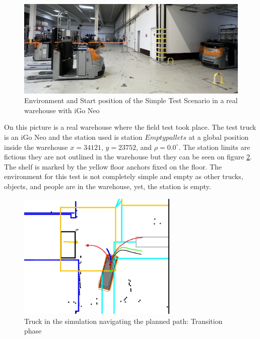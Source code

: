 \begin{figure}[H]
    \begin{center}
        \includegraphics[width=5in]{images/Chap3/Start_Sc1.jpg} %
        \caption{Environment and Start position of the Simple Test Scenario in a real warehouse
        with iGo Neo}
        \label{OptResult11}
        \end{center}    
\end{figure}

On this picture is a real warehouse where the field test took place.
The test truck is an iGo Neo and the station used is station \(Empty pallets\) at a 
global position inside the warehouse \(x = 34121\), \(y = 23752\), and \(\rho = 0.0^\circ\).
The station limits are fictious they are not outlined in the warehouse 
but they can be seen on figure \ref{OptResult10}.
The shelf is marked by the yellow floor anchors fixed on the floor.
The environment for this test is not completely simple and empty as 
other trucks, objects, and people are in the warehouse, yet, the station is 
empty. 

\begin{figure}[H]
    \begin{center}
        \includegraphics[width=3in]{images/Chap3/Test1_transition.png} %
        \caption{Truck in the simulation navigating the planned path: Transition phase}
        \label{OptResult10}
        \end{center}    
\end{figure}


